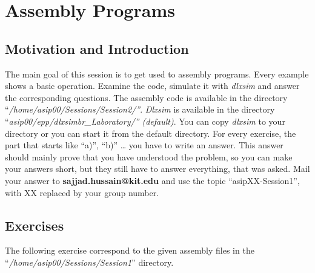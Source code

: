 \hypertarget{assembly-programs}{%
\chapter*{Assembly Programs}\label{assembly-programs}}


\section*{Motivation and Introduction}

The main goal of this session is to get used to assembly programs. Every
example shows a basic operation. Examine the code, simulate it with
\emph{dlxsim} and answer the corresponding questions. The assembly code
is available in the directory
``\emph{/home/asip00/Sessions/Session2/''}. \emph{Dlxsim} is available
in the directory
``\emph{asip00/}\emph{epp/dlxsimbr\_}\emph{Laboratory/'' (default)}. You
can copy \emph{dlxsim} to your directory or you can start it from the
default directory. For every exercise, the part that starts like ``a)'',
``b)'' \ldots{} you have to write an answer. This answer should mainly
prove that you have understood the problem, so you can make your answers
short, but they still have to answer everything, that was asked. Mail
your answer to \textbf{sajjad.hussain@kit.edu} and use the topic
``asipXX-Session1'', with XX replaced by your group number.

\section*{Exercises}

The following exercise correspond to the given assembly files in the
``\emph{/home/asip00/Sessions/Session1}'' directory.

